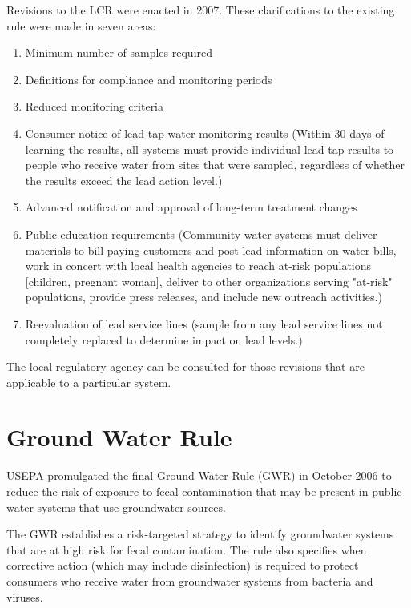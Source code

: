 \documentclass[10pt]{article}
\begin{document}
Revisions to the LCR were enacted in 2007. These clarifications to the existing rule were made in seven areas:

\begin{enumerate}
  \item Minimum number of samples required

  \item Definitions for compliance and monitoring periods

  \item Reduced monitoring criteria

  \item Consumer notice of lead tap water monitoring results (Within 30 days of learning the results, all systems must provide individual lead tap results to people who receive water from sites that were sampled, regardless of whether the results exceed the lead action level.)

  \item Advanced notification and approval of long-term treatment changes

  \item Public education requirements (Community water systems must deliver materials to bill-paying customers and post lead information on water bills, work in concert with local health agencies to reach at-risk populations [children, pregnant woman], deliver to other organizations serving "at-risk" populations, provide press releases, and include new outreach activities.)

  \item Reevaluation of lead service lines (sample from any lead service lines not completely replaced to determine impact on lead levels.)

\end{enumerate}
The local regulatory agency can be consulted for those revisions that are applicable to a particular system.

\section{Ground Water Rule}
USEPA promulgated the final Ground Water Rule (GWR) in October 2006 to reduce the risk of exposure to fecal contamination that may be present in public water systems that use groundwater sources.

The GWR establishes a risk-targeted strategy to identify groundwater systems that are at high risk for fecal contamination. The rule also specifies when corrective action (which may include disinfection) is required to protect consumers who receive water from groundwater systems from bacteria and viruses.
\end{document}
